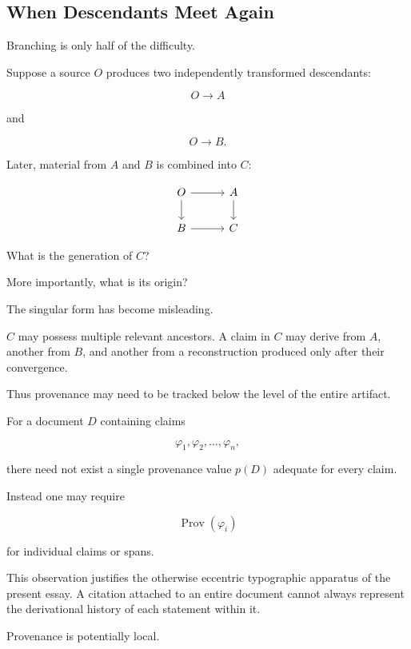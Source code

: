\documentclass[
  11pt,
  a4paper,
  DIV=12,
  BCOR=0mm,
  parskip=half-
]{scrartcl}
\newcommand{\Prov}{\operatorname{Prov}}
\theoremstyle{definition}
\theoremstyle{plain}
\theoremstyle{remark}
\begin{document}
\subsection{When Descendants Meet Again}
\label{sec:descendants-meet}

Branching is only half of the difficulty.

Suppose a source \(O\) produces two independently transformed descendants:

\[
  O\longrightarrow A
\]

and

\[
  O\longrightarrow B.
\]

Later, material from \(A\) and \(B\) is combined into \(C\):

\[
\begin{tikzcd}[column sep=3em]
O \arrow[r] \arrow[d] & A \arrow[d] \\
B \arrow[r] & C
\end{tikzcd}
\]

What is the generation of \(C\)?

More importantly, what is its origin?

The singular form has become misleading.

\(C\) may possess multiple relevant ancestors. A claim in \(C\) may derive
from \(A\), another from \(B\), and another from a reconstruction produced
only after their convergence.

Thus provenance may need to be tracked below the level of the entire artifact.

For a document \(D\) containing claims

\[
  \varphi_1,\varphi_2,\ldots,\varphi_n,
\]

there need not exist a single provenance value \(p(D)\) adequate for every
claim.

Instead one may require

\[
  \Prov(\varphi_i)
\]

for individual claims or spans.

This observation justifies the otherwise eccentric typographic apparatus of
the present essay. A citation attached to an entire document cannot always
represent the derivational history of each statement within it.

Provenance is potentially local.

\end{document}
